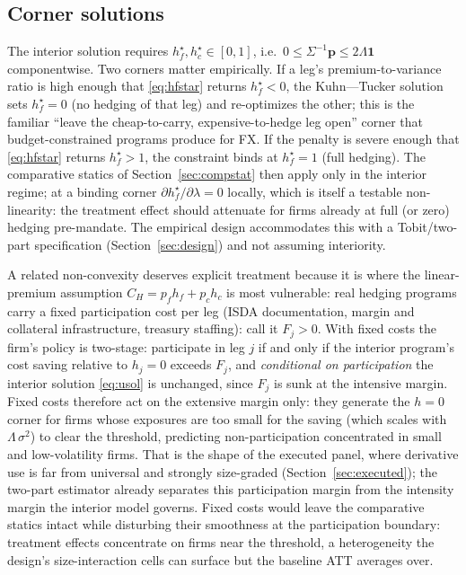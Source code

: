 \documentclass[11pt,a4paper]{article}
\begin{document}
\subsection{Corner solutions}
\label{sec:corner}

The interior solution requires $h_f^\star,h_c^\star\in[0,1]$, i.e.\ $0\le\Sigma^{-1}\mathbf p\le 2\Lambda\mathbf 1$ componentwise. Two corners matter empirically. If a leg's premium-to-variance ratio is high enough that \eqref{eq:hfstar} returns $h_f^\star<0$, the Kuhn---Tucker solution sets $h_f^\star=0$ (no hedging of that leg) and re-optimizes the other; this is the familiar ``leave the cheap-to-carry, expensive-to-hedge leg open'' corner that budget-constrained programs produce for FX. If the penalty is severe enough that \eqref{eq:hfstar} returns $h_f^\star>1$, the constraint binds at $h_f^\star=1$ (full hedging). The comparative statics of Section~\ref{sec:compstat} then apply only in the interior regime; at a binding corner $\partial h_f^\star/\partial\lambda=0$ locally, which is itself a testable non-linearity: the treatment effect should attenuate for firms already at full (or zero) hedging pre-mandate. The empirical design accommodates this with a Tobit/two-part specification (Section~\ref{sec:design}) and not assuming interiority.

A related non-convexity deserves explicit treatment because it is where the linear-premium assumption $C_H=p_fh_f+p_ch_c$ is most vulnerable: real hedging programs carry a fixed participation cost per leg (ISDA documentation, margin and collateral infrastructure, treasury staffing): call it $F_j>0$. With fixed costs the firm's policy is two-stage: participate in leg $j$ if and only if the interior program's cost saving relative to $h_j=0$ exceeds $F_j$, and \emph{conditional on participation} the interior solution \eqref{eq:usol} is unchanged, since $F_j$ is sunk at the intensive margin. Fixed costs therefore act on the extensive margin only: they generate the $h=0$ corner for firms whose exposures are too small for the saving (which scales with $\Lambda\,\sigma^2$) to clear the threshold, predicting non-participation concentrated in small and low-volatility firms. That is the shape of the executed panel, where derivative use is far from universal and strongly size-graded (Section~\ref{sec:executed}); the two-part estimator already separates this participation margin from the intensity margin the interior model governs. Fixed costs would leave the comparative statics intact while disturbing their smoothness at the participation boundary: treatment effects concentrate on firms near the threshold, a heterogeneity the design's size-interaction cells can surface but the baseline ATT averages over.
\end{document}
